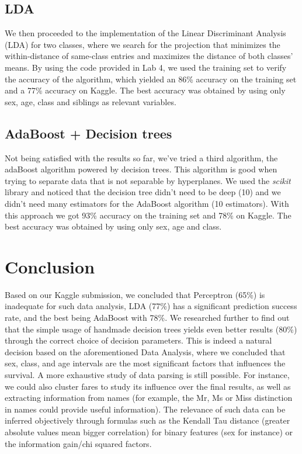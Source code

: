\documentclass[12pt,a4paper]{article}
\begin{document}
\subsection{LDA} 
We then proceeded to the implementation of the Linear Discriminant Analysis (LDA) for two classes, where we search for the projection that minimizes the within-distance of same-class entries and maximizes the distance of both classes' means. By using the code provided in Lab 4, we used the training set to verify the accuracy of the algorithm, which yielded an 86\% accuracy on the training set and a 77\% accuracy on Kaggle. The best accuracy was obtained by using only sex, age, class and siblings as relevant variables. 

\subsection{AdaBoost + Decision trees}
Not being satisfied with the results so far, we've tried a third algorithm, the adaBoost algorithm powered by decision trees. This algorithm is good when trying to separate data that is not separable by hyperplanes. We used the \textit{scikit} library and noticed that the decision tree didn't need to be deep (10) and we didn't need many estimators for the AdaBoost algorithm (10 estimators). With this approach we got 93\% accuracy on the training set and 78\% on Kaggle. The best accuracy was obtained by using only sex, age and class.

\section*{Conclusion} 
Based on our Kaggle submission, we concluded that Perceptron (65\%) is inadequate for such data analysis, LDA (77\%) has a significant prediction success rate, and the best being AdaBoost with 78\%. We researched further to find out that the simple usage of handmade decision trees yields even better results (80\%)  through the correct choice of decision parameters. This is indeed a natural decision based on the aforementioned Data Analysis, where we concluded that sex, class, and age intervals are the most significant factors that influences the survival. A more exhaustive study of data parsing is still possible. For instance, we could also cluster fares to study its influence over the final results, as well as extracting information from names (for example, the Mr, Ms or Miss distinction in names could provide useful information). The relevance of such data can be inferred objectively through formulas such as the Kendall Tau distance (greater absolute values mean bigger correlation) for binary features (sex for instance) or the information gain/chi squared factors.
\end{document}
